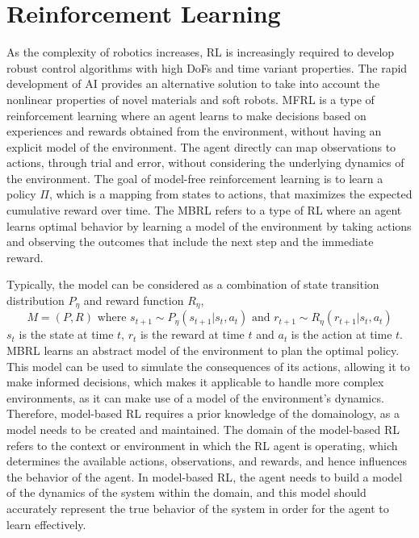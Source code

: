 \section{Reinforcement Learning}
As the complexity of robotics increases, \ac{RL} is increasingly required to develop robust control algorithms with high \ac{DoF}s and time variant properties\cite{zhangEffectiveSoftRobot2017}. The rapid development of AI provides an alternative solution to take into account the nonlinear properties of novel materials and soft robots\cite{tangModelbasedOnlineLearning2021}. \ac{MFRL} is a type of reinforcement learning where an agent learns to make decisions based on experiences and rewards obtained from the environment, without having an explicit model of the environment. The agent directly can map observations to actions, through trial and error, without considering the underlying dynamics of the environment\cite{arulkumaranDeepReinforcementLearning2017}. The goal of model-free reinforcement learning is to learn a policy $\Pi$, which is a mapping from states to actions, that maximizes the expected cumulative reward over time. The \ac{MBRL} refers to a type of \ac{RL} where an agent learns optimal behavior by learning a model of the environment by taking actions and observing the outcomes that include the next step and the immediate reward\cite{rayModelBasedReinforcementLearning2010}. 

Typically, the model can be considered as a combination of state transition distribution $P_\eta$ and reward function $R_\eta$, $$M = (P,R) \textrm{ where } s_{t+1}\sim P_\eta(s_{t+1}|s_t, a_t) \textrm{ and } r_{t+1}\sim R_\eta(r_{t+1}|s_t, a_t)$$ $s_t$ is the state at time $t$, $r_t$ is the reward at time $t$ and $a_t$ is the action at time $t$. \ac{MBRL} learns an abstract model of the environment to plan the optimal policy. This model can be used to simulate the consequences of its actions, allowing it to make informed decisions, which makes it applicable to handle more complex environments, as it can make use of a model of the environment's dynamics. Therefore, model-based \ac{RL} requires a prior knowledge of the domainology\cite{tangModelbasedOnlineLearning2021}, as a model needs to be created and maintained. The domain of the model-based \ac{RL} refers to the context or environment in which the \ac{RL} agent is operating, which determines the available actions, observations, and rewards, and hence influences the behavior of the agent\cite{langExplorationRelationalDomains}. In model-based \ac{RL}, the agent needs to build a model of the dynamics of the system within the domain, and this model should accurately represent the true behavior of the system in order for the agent to learn effectively.
